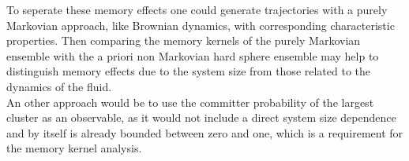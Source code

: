 To seperate these memory effects one could generate trajectories with a purely Markovian approach, like Brownian dynamics, with corresponding characteristic properties. Then comparing the memory kernels of the purely Markovian ensemble with the a priori non Markovian hard sphere ensemble may help to distinguish memory effects due to the system size from those related to the dynamics of the fluid.\\

An other approach would be to use the committer probability of the largest cluster as an observable, as it would not include a direct system size dependence and by itself is already bounded between zero and one, which is a requirement for the memory kernel analysis.
